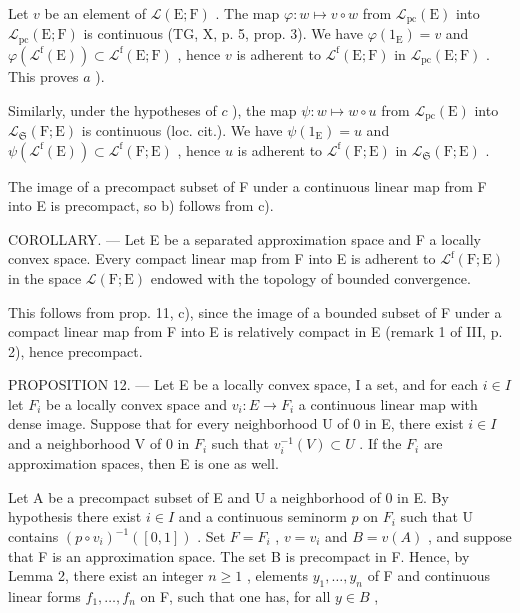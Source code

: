 Let \(v\) be an element of \(\mathcal{L}(\mathrm{E};\mathrm{F})\) . The map \(\varphi\colon w\mapsto v\circ w\) from \(\mathcal{L}_{\mathrm{pc}}(\mathrm{E})\) into \(\mathcal{L}_{\mathrm{pc}}(\mathrm{E};\mathrm{F})\) is continuous (TG, X, p. 5, prop. 3). We have \(\varphi(1_{\mathrm{E}})=v\) and \(\varphi(\mathcal{L}^{\mathrm{f}}(\mathrm{E}))\subset\mathcal{L}^{\mathrm{f}}(\mathrm{E};\mathrm{F})\) , hence \(v\) is adherent to \(\mathcal{L}^{\mathrm{f}}(\mathrm{E};\mathrm{F})\) in \(\mathcal{L}_{\mathrm{pc}}(\mathrm{E};\mathrm{F})\) . This proves \(a\) ).

Similarly, under the hypotheses of \(c\) ), the map \(\psi: w \mapsto w \circ u\) from \(\mathcal{L}_{\mathrm{pc}}(\mathrm{E})\) into \(\mathcal{L}_{\mathfrak{S}}(\mathrm{F};\mathrm{E})\) is continuous (loc. cit.). We have \(\psi(1_{\mathrm{E}}) = u\) and \(\psi(\mathcal{L}^{\mathrm{f}}(\mathrm{E})) \subset \mathcal{L}^{\mathrm{f}}(\mathrm{F};\mathrm{E})\) , hence \(u\) is adherent to \(\mathcal{L}^{\mathrm{f}}(\mathrm{F};\mathrm{E})\) in \(\mathcal{L}_{\mathfrak{S}}(\mathrm{F};\mathrm{E})\) .

The image of a precompact subset of F under a continuous linear map from F into E is precompact, so b) follows from c).

COROLLARY. --- Let E be a separated approximation space and F a locally convex space. Every compact linear map from F into E is adherent to \(\mathcal{L}^{\mathrm{f}}(\mathrm{F};\mathrm{E})\) in the space \(\mathcal{L}(\mathrm{F};\mathrm{E})\) endowed with the topology of bounded convergence.

This follows from prop. 11, c), since the image of a bounded subset of F under a compact linear map from F into E is relatively compact in E (remark 1 of III, p. 2), hence precompact.

PROPOSITION 12. --- Let E be a locally convex space, I a set, and for each \(i \in I\) let \(F_{i}\) be a locally convex space and \(v_{i}: E \to F_{i}\) a continuous linear map with dense image. Suppose that for every neighborhood U of 0 in E, there exist \(i \in I\) and a neighborhood V of 0 in \(F_{i}\) such that \(v_{i}^{-1}(V) \subset U\) . If the \(F_{i}\) are approximation spaces, then E is one as well.

Let A be a precompact subset of E and U a neighborhood of 0 in E. By hypothesis there exist \(i \in I\) and a continuous seminorm \(p\) on \(F_i\) such that U contains \((p \circ v_i)^{-1}([0,1])\) . Set \(F = F_i\) , \(v = v_i\) and \(B = v(A)\) , and suppose that F is an approximation space. The set B is precompact in F. Hence, by Lemma 2, there exist an integer \(n \geqslant 1\) , elements \(y_1, \ldots, y_n\) of F and continuous linear forms \(f_1, \ldots, f_n\) on F, such that one has, for all \(y \in B\) ,


